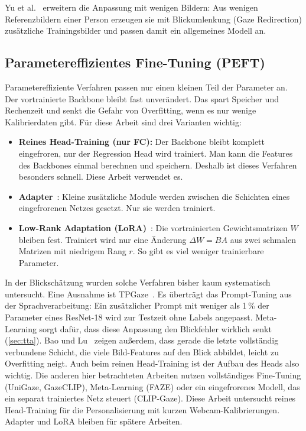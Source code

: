 Yu et al.~\cite{yu2019redirection} erweitern die Anpassung mit wenigen
Bildern: Aus wenigen Referenzbildern einer Person erzeugen sie mit
Blickumlenkung (Gaze Redirection) zusätzliche Trainingsbilder und passen damit
ein allgemeines Modell an.

\subsection{Parametereffizientes Fine-Tuning (PEFT)}
\label{subsec:peft}
Parametereffiziente Verfahren passen nur einen kleinen Teil der Parameter an.
Der vortrainierte Backbone bleibt fast unverändert. Das spart Speicher und
Rechenzeit und senkt die Gefahr von Overfitting, wenn es nur wenige
Kalibrierdaten gibt. Für diese Arbeit sind drei Varianten wichtig:
\begin{itemize}
  \item \textbf{Reines Head-Training (nur FC):} Der Backbone bleibt komplett
        eingefroren, nur der Regression Head wird trainiert. Man kann die
        Features des Backbones einmal berechnen und speichern. Deshalb ist
        dieses Verfahren besonders schnell. Diese Arbeit verwendet es.
  \item \textbf{Adapter}~\cite{houlsby2019adapter}: Kleine zusätzliche Module
        werden zwischen die Schichten eines eingefrorenen Netzes gesetzt. Nur
        sie werden trainiert.
  \item \textbf{Low-Rank Adaptation (LoRA)}~\cite{hu2022lora}: Die
        vortrainierten Gewichtsmatrizen $W$ bleiben fest. Trainiert wird nur
        eine Änderung $\Delta W = BA$ aus zwei schmalen Matrizen mit niedrigem
        Rang $r$. So gibt es viel weniger trainierbare Parameter.
\end{itemize}
In der Blickschätzung wurden solche Verfahren bisher kaum systematisch
untersucht. Eine Ausnahme ist TPGaze~\cite{liu2024tpgaze}. Es überträgt das
Prompt-Tuning aus der Sprachverarbeitung: Ein zusätzlicher Prompt mit weniger
als 1\,\% der Parameter eines ResNet-18 wird zur Testzeit ohne Labels
angepasst. Meta-Learning sorgt dafür, dass diese Anpassung den Blickfehler
wirklich senkt (\cref{sec:tta}). Bao und Lu~\cite{bao2024feature2gaze} zeigen
außerdem, dass gerade die letzte vollständig verbundene Schicht, die viele
Bild-Features auf den Blick abbildet, leicht zu Overfitting neigt. Auch beim
reinen Head-Training ist der Aufbau des Heads also wichtig. Die anderen hier
betrachteten Arbeiten nutzen vollständiges Fine-Tuning (UniGaze, GazeCLIP),
Meta-Learning (FAZE) oder ein eingefrorenes Modell, das ein separat trainiertes
Netz steuert (CLIP-Gaze). Diese Arbeit untersucht reines Head-Training für die
Personalisierung mit kurzen Webcam-Kalibrierungen. Adapter und LoRA bleiben
für spätere Arbeiten.

